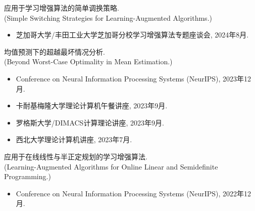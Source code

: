\documentclass[margin, 10pt]{res-short} %
\begin{document}
\begin{resume}
应用于学习增强算法的简单调换策略.\\
(Simple Switching Strategies for Learning-Augmented Algorithms.)
\begin{itemize}
\item 芝加哥大学/丰田工业大学芝加哥分校\;学习增强算法\;专题座谈会, 2024年8月.
\end{itemize}

均值预测下的超越最坏情况分析.\\
(Beyond Worst-Case Optimality in Mean Estimation.)
\begin{itemize}
\item Conference on Neural Information Processing Systems (NeurIPS), 2023年12月.
\item 卡耐基梅隆大学\;理论计算机午餐讲座, 2023年9月.
\item 罗格斯大学/DIMACS\;计算理论讲座, 2023年9月.
\item 西北大学\;理论计算机讲座, 2023年7月.
\end{itemize}

应用于在线线性与半正定规划的学习增强算法.\\
(Learning-Augmented Algorithms for Online Linear and Semidefinite Programming.)
\begin{itemize}
\item Conference on Neural Information Processing Systems (NeurIPS), 2022年12月.
\end{itemize}


\end{resume}
\end{document}
